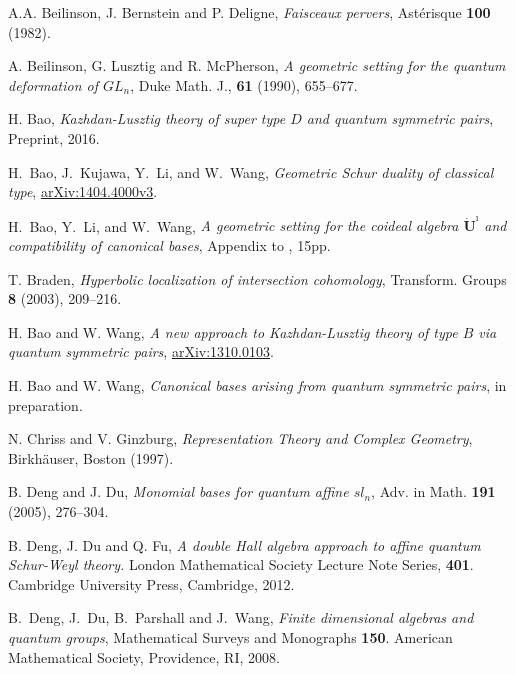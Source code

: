\documentclass[12pt,reqno]{amsart}
\numberwithin{equation}{section}
\theoremstyle{definition}
\theoremstyle{plain}
\begin{document}
\clearpage
\begin{thebibliography}{DDPW08}\frenchspacing

A.A. Beilinson, J. Bernstein and P. Deligne,
{\em Faisceaux pervers},
Ast\'{e}risque {\bf 100} (1982).

A. Beilinson, G. Lusztig and R. McPherson,
          {\em A geometric setting for the quantum deformation of $GL_n$}, 
Duke Math. J., {\bf 61} (1990), 655--677.

H. Bao, 
{\em Kazhdan-Lusztig theory of super type $D$ and quantum symmetric pairs}, Preprint, 2016.

H.~Bao, J.~Kujawa, Y.~Li, and W.~Wang,
{\em Geometric {S}chur duality of classical type}, 
\href{http://arxiv.org/abs/1404.4000}{arXiv:1404.4000v3}.

H.~Bao,  Y.~Li, and W.~Wang, 
{\em A geometric setting for the coideal algebra $\dot{\mathbf{U}}^\imath$  and compatibility of canonical bases}, 
Appendix to \cite{BKLW14}, 15pp.

T. Braden,
{\em Hyperbolic localization of intersection cohomology},
Transform. Groups {\bf 8} (2003),  209--216.

H. Bao and W. Wang,
{\em A new approach to Kazhdan-Lusztig theory of type $B$ via quantum symmetric pairs},
\href{http://arxiv.org/abs/1310.0103}{	arXiv:1310.0103}.

 H. Bao and W. Wang,
{\em Canonical bases arising from quantum symmetric pairs},   
in preparation.

 N. Chriss and V. Ginzburg,
        {\em Representation Theory and Complex Geometry},
        Birkh\"auser, Boston (1997).

B. Deng and J. Du, 
{\em Monomial bases for quantum affine $sl_n$}, 
Adv. in  Math.  {\bf 191} (2005), 276--304.

B. Deng, J. Du and Q.  Fu,
{\em A double Hall algebra approach to affine quantum Schur-Weyl theory.}
London Mathematical Society Lecture Note Series, {\bf 401}.
Cambridge University Press, Cambridge, 2012.

B.~Deng, J.~Du, B.~Parshall and J.~Wang, 
{\em Finite dimensional algebras and quantum groups}, 
Mathematical Surveys and Monographs {\bf 150}.
American Mathematical Society, Providence, RI, 2008.


\end{thebibliography}
\end{document}
